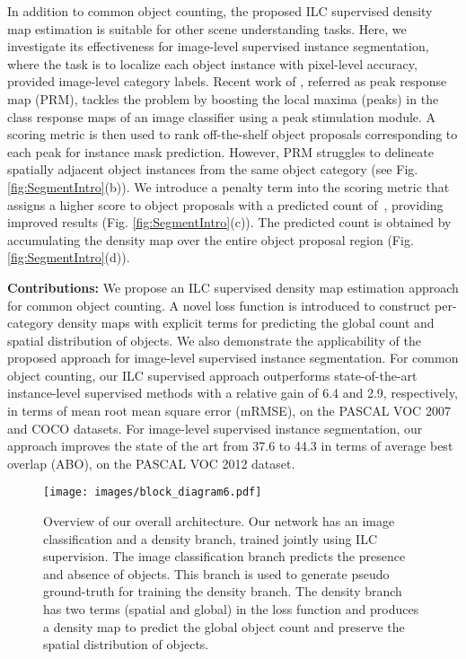 \documentclass[10pt,twocolumn,letterpaper]{article}
\begin{document}
In addition to common object counting, the proposed ILC supervised density map estimation is suitable for other scene understanding tasks. Here, we investigate its effectiveness for image-level supervised instance segmentation, where the task is to localize each object instance with pixel-level accuracy, provided image-level category labels. Recent work of \cite{PRM}, referred as peak response map (PRM), tackles the problem by boosting the local maxima (peaks) in the class response maps \cite{oquab2015object} of an image classifier using a peak stimulation module. A scoring metric is then used to rank off-the-shelf object proposals \cite{mcg_2017,cob_eccv2016} corresponding to each peak for instance mask prediction.  However, PRM  struggles to delineate spatially adjacent object instances from the same object category (see Fig. \ref{fig:SegmentIntro}(b)). We introduce a penalty term into the scoring metric that assigns a higher score to object proposals with a predicted count of~, providing improved results (Fig. \ref{fig:SegmentIntro}(c)). The predicted count is obtained by accumulating the density map over the entire object proposal region (Fig. \ref{fig:SegmentIntro}(d)). 
 
\noindent\textbf{Contributions:} We propose an ILC supervised density map estimation approach for common object counting. A novel loss function is introduced to construct per-category density maps with explicit terms for predicting the global count and spatial distribution of objects.  We also demonstrate the applicability of the proposed approach for image-level  supervised instance segmentation. For common object counting, our ILC supervised approach outperforms state-of-the-art instance-level supervised methods with a relative gain of 6.4 and 2.9, respectively, in terms of mean root mean square error (mRMSE), on the PASCAL VOC 2007 and COCO datasets. For image-level supervised instance segmentation, our approach  improves the state of the art from 37.6 to 44.3 in terms of average best overlap (ABO), on the PASCAL VOC 2012 dataset.
  	\begin{figure*}[t]
		\centering
						\texttt{[image: images/block\_diagram6.pdf]}\\ \vspace{-0.1cm}


			\caption{Overview of our overall architecture. Our network has an image classification and a density branch, trained jointly using ILC supervision. The image classification branch predicts the presence and absence of objects. This branch is used to generate pseudo ground-truth for training the density branch. The density branch has two terms (spatial and global) in the loss function and produces a density map to predict the global object count and preserve the spatial distribution of objects. }
			\label{Fig:architectue}
			\vspace*{-0.2cm}
\end{figure*}
\end{document}
